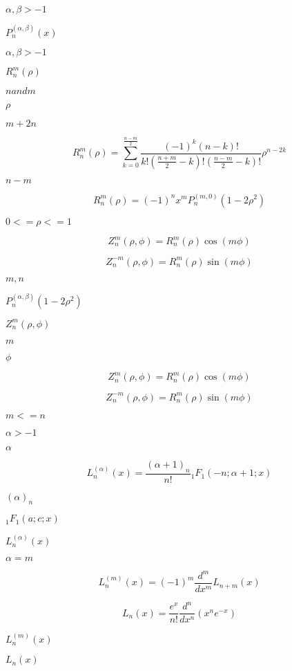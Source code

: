 \documentclass{article}
\begin{document}
$ \alpha,\beta > -1 $
\pagebreak

$ P_n^{(\alpha,\beta)}(x) $
\pagebreak

$ \alpha, \beta > -1 $
\pagebreak

$ R_n^m(\rho) $
\pagebreak

$ n and m $
\pagebreak

$ \rho $
\pagebreak

$ m + 2n $
\pagebreak

\[ R_n^m(\rho) = \sum_{k=0}^{\frac{n-m}{2}} \frac{(-1)^k(n-k)!}{k!(\frac{n+m}{2}-k)!(\frac{n-m}{2}-k)!} \rho^{n-2k} \]
\pagebreak

$ n - m $
\pagebreak

\[ R_n^m(\rho) = (-1)^n x^m P_n^{(m,0)}(1-2\rho^2) \]
\pagebreak

$ 0 <= \rho <= 1 $
\pagebreak

\[ Z_n^m(\rho,\phi) = R_n^m(\rho) \cos(m\phi) \]
\pagebreak

\[ Z_n^{-m}(\rho,\phi) = R_n^m(\rho) \sin(m\phi) \]
\pagebreak

$ m, n $
\pagebreak

$ P_n^{(\alpha,\beta)}(1 - 2\rho^2) $
\pagebreak

$ Z_n^m(\rho,\phi) $
\pagebreak

$ m $
\pagebreak

$ \phi $
\pagebreak

\[ Z_n^m(\rho,\phi) = R_n^m(\rho)\cos(m\phi) \]
\pagebreak

\[ Z_n^{-m}(\rho,\phi) = R_n^m(\rho)\sin(m\phi) \]
\pagebreak

$ m <= n $
\pagebreak

$ \alpha > -1 $
\pagebreak

$ \alpha $
\pagebreak

\[ L_n^{(\alpha)}(x) = \frac{(\alpha + 1)_n}{n!} {}_1F_1(-n; \alpha + 1; x) \]
\pagebreak

$ (\alpha)_n $
\pagebreak

$ {}_1F_1(a; c; x) $
\pagebreak

$ L_n^{(\alpha)}(x) $
\pagebreak

$ \alpha = m $
\pagebreak

\[ L_n^{(m)}(x) = (-1)^m \frac{d^m}{dx^m} L_{n + m}(x) \]
\pagebreak

\[ L_n(x) = \frac{e^x}{n!} \frac{d^n}{dx^n} (x^ne^{-x}) \]
\pagebreak

$ L_n^{(m)}(x) $
\pagebreak

$ L_n(x) $
\pagebreak
\end{document}
